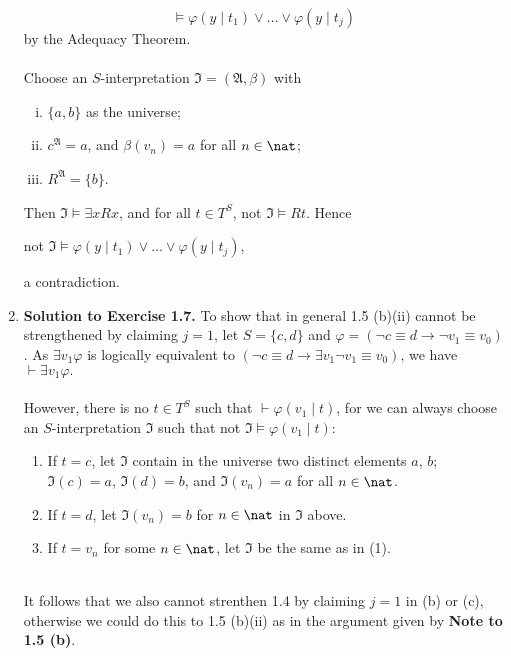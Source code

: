 \begin{enumerate}[1.]
\[\models \varphi (y \mid t_1) \lor \ldots \lor \varphi (y \mid t_j)
\]
by the Adequacy Theorem.\\
\ \\
Choose an $S$-interpretation $\mathfrak{I} = (\mathfrak{A}, \beta)$ with
\begin{enumerate}[(i)]
\item $\{ a, b \}$ as the universe;
\item $c^\mathfrak{A} = a$, and $\beta (v_n) = a$ for all $n \in \nat$;
\item $R^\mathfrak{A} = \{ b \}$.
\end{enumerate}
Then $\mathfrak{I} \models \exists x Rx$, and for all $t \in T^S$, not $\mathfrak{I} \models Rt$. Hence
\begin{center}
not $\mathfrak{I} \models \varphi (y \mid t_1) \lor \ldots \lor \varphi (y \mid t_j)$,
\end{center}
a contradiction.
%
\item \textbf{Solution to Exercise 1.7.} To show that in general 1.5 (b)(ii) cannot be strengthened by claiming $j = 1$, let $S = \{ c, d \}$ and $\varphi = (\neg c \equiv d \rightarrow \neg v_1 \equiv v_0)$. As $\exists v_1 \varphi$ is logically equivalent to $(\neg c \equiv d \rightarrow \exists v_1 \neg v_1 \equiv v_0)$, we have $\vdash \exists v_1 \varphi.$\\
\ \\
However, there is no $t \in T^S$ such that $\vdash \varphi (v_1 \mid t)$, for we can always choose an $S$-interpretation $\mathfrak{I}$ such that not $\mathfrak{I} \models \varphi (v_1 \mid t)$:
\begin{enumerate}[(1)]
\item If $t = c$, let $\mathfrak{I}$ contain in the universe two distinct elements $a$, $b$; $\mathfrak{I}(c) = a$, $\mathfrak{I}(d) = b$, and $\mathfrak{I}(v_n) = a$ for all $n \in \nat$.
\item If $t = d$, let $\mathfrak{I}(v_n) = b$ for $n \in \nat$ in $\mathfrak{I}$ above.
\item If $t = v_n$ for some $n \in \nat$, let $\mathfrak{I}$ be the same as in (1).
\end{enumerate}
\ \\
It follows that we also cannot strenthen 1.4 by claiming $j = 1$ in (b) or (c), otherwise we could do this to 1.5 (b)(ii) as in the argument given by \textbf{Note to 1.5 (b)}.
\end{enumerate}
